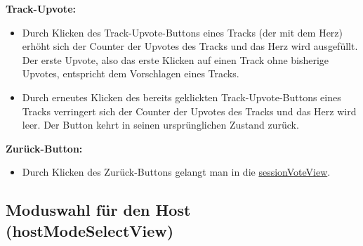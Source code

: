 \documentclass[oneside, ngerman]{sdqtechreport}
\begin{document}
\textbf{Track-Upvote:}
\begin{itemize}
    \item Durch Klicken des Track-Upvote-Buttons eines Tracks (der mit dem Herz) erhöht sich der Counter der Upvotes des Tracks und das Herz wird ausgefüllt. Der erste Upvote, also das erste Klicken auf einen Track ohne bisherige Upvotes, entspricht dem Vorschlagen eines Tracks.
    \item Durch erneutes Klicken des bereits geklickten Track-Upvote-Buttons eines Tracks verringert sich der Counter der Upvotes des Tracks und das Herz wird leer. Der Button kehrt in seinen ursprünglichen Zustand zurück.
\end{itemize}

\textbf{Zurück-Button:}
\begin{itemize}
    \item Durch Klicken des Zurück-Buttons gelangt man in die  \hyperlink{sessionVoteView}{sessionVoteView}.
\end{itemize}

\subsection{Moduswahl für den Host (hostModeSelectView)}
\label{sec:Benutzeroberfläche:joinSessionView}
\end{document}
